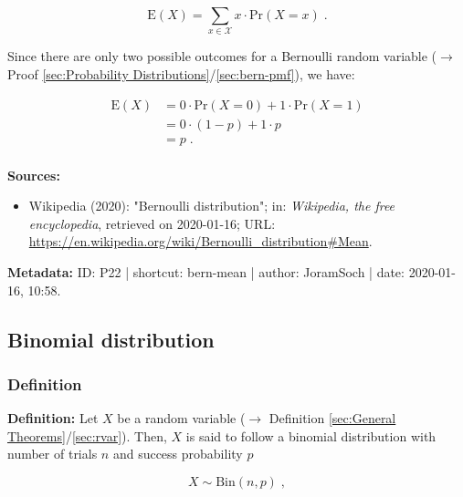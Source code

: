 \documentclass[a4paper,12pt,twoside]{book}
\begin{document}
\begin{equation} \label{eq:bern-mean-mean}
\mathrm{E}(X) = \sum_{x \in \mathcal{X}} x \cdot \mathrm{Pr}(X = x) \; .
\end{equation}

Since there are only two possible outcomes for a Bernoulli random variable ($\rightarrow$ Proof \ref{sec:Probability Distributions}/\ref{sec:bern-pmf}), we have:

\begin{equation} \label{eq:bern-mean-bern-mean-qed}
\begin{split}
\mathrm{E}(X) &= 0 \cdot \mathrm{Pr}(X = 0) + 1 \cdot \mathrm{Pr}(X = 1) \\
&= 0 \cdot (1-p) + 1 \cdot p \\
&= p \; . \\
\end{split}
\end{equation}


\vspace{1em}
\textbf{Sources:}
\begin{itemize}
\item Wikipedia (2020): "Bernoulli distribution"; in: \textit{Wikipedia, the free encyclopedia}, retrieved on 2020-01-16; URL: \url{https://en.wikipedia.org/wiki/Bernoulli_distribution#Mean}.
\end{itemize}


\vspace{1em}
\textbf{Metadata:} ID: P22 | shortcut: bern-mean | author: JoramSoch | date: 2020-01-16, 10:58.
\vspace{1em}



\subsection{Binomial distribution}

\subsubsection[\textit{Definition}]{Definition} \label{sec:bin}
\setcounter{equation}{0}

\textbf{Definition:} Let $X$ be a random variable ($\rightarrow$ Definition \ref{sec:General Theorems}/\ref{sec:rvar}). Then, $X$ is said to follow a binomial distribution with number of trials $n$ and success probability $p$

\begin{equation} \label{eq:bin-bin}
X \sim \mathrm{Bin}(n, p) \; ,
\end{equation}
\end{document}

